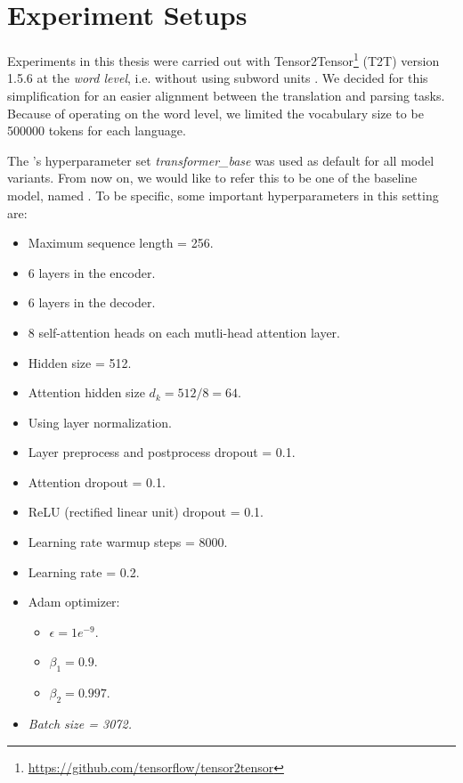 \section{Experiment Setups}
\label{dataexp-exp}

Experiments in this thesis were carried out with Tensor2Tensor\footnote{\url{https://github.com/tensorflow/tensor2tensor}} (T2T) version 1.5.6 at the
\emph{word level}, i.e. without using subword units \citep{sennrich2015neural}.
We decided for this simplification for an easier alignment between the translation and parsing tasks.
Because of operating on the word level, we limited the vocabulary size to be 500000 tokens for each language.

The \transformer's hyperparameter set \textit{transformer\_base} \citep{TrainingTipsfortheTransformerModel} was used as default for all model variants. From now on, we would like to refer this to be one of the baseline model, named \transformerbase. To be specific, some important hyperparameters in this setting are:
\begin{itemize}
    \item Maximum sequence length = 256.
    \item 6 layers in the encoder.
    \item 6 layers in the decoder.
    \item 8 self-attention heads on each mutli-head attention layer.
    \item Hidden size = 512.
    \item Attention hidden size $d_k=512/8=64$.
    \item Using layer normalization.
    \item Layer preprocess and postprocess dropout = 0.1.
    \item Attention dropout = 0.1.
    \item ReLU (rectified linear unit) dropout = 0.1.
    \item Learning rate warmup steps = 8000.
    \item Learning rate = 0.2.
    \item Adam optimizer:
        \begin{itemize}
            \item $\epsilon = 1e^{-9}$.
            \item $\beta_1 = 0.9$.
            \item $\beta_2 = 0.997$.
        \end{itemize}
    \item \textit{Batch size = 3072.}
\end{itemize}

